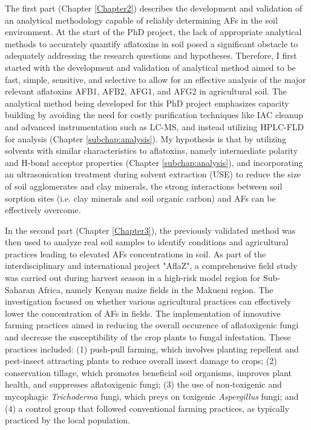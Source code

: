 The first part (Chapter \ref{Chapter2}) describes the development and validation of an analytical methodology capable of reliably determining AFs in the soil environment. At the start of the PhD project, the lack of appropriate analytical methods to accurately quantify aflatoxins in soil posed a significant obstacle to adequately addressing the research questions and hypotheses. Therefore, I first started with the development and validation of analytical method aimed to be fast, simple, sensitive, and selective to allow for an effective analysis of the major relevant aflatoxins AFB1, AFB2, AFG1, and AFG2 in agricultural soil. The analytical method being developed for this PhD project emphasizes capacity building by avoiding the need for costly purification techniques like IAC cleanup and advanced instrumentation such as LC-MS, and instead utilizing HPLC-FLD for analysis (Chapter \ref{subchap:analysis}). My hypothesis is that by utilizing solvents with similar characteristics to aflatoxins, namely intermediate polarity and H-bond acceptor properties (Chapter \ref{subchap:analysis}), and incorporating an ultrasonication treatment during solvent extraction (USE) to reduce the size of soil agglomerates and clay minerals, the strong interactions between soil sorption sites (i.e. clay minerals and soil organic carbon) and AFs can be effectively overcome.


In the second part (Chapter \ref{Chapter3}), the previously validated method was then used to analyze real soil samples to identify conditions and agricultural practices leading to elevated AFs concentrations in soil. As part of the interdisciplinary and international project "AflaZ", a comprehensive field study was carried out during harvest season in a high-risk model region for Sub-Saharan Africa, namely Kenyan maize fields in the Makueni region. The investigation focused on whether various agricultural practices can effectively lower the concentration of AFs in fields. The implementation of innovative farming practices aimed in reducing the overall occurence of aflatoxigenic fungi and decrease the susceptibility of the crop plants to fungal infestation. These practices included: (1) push-pull farming, which involves planting repellent and pest-insect attracting plants to reduce overall insect damage to crops; (2) conservation tillage, which promotes beneficial soil organisms, improves plant health, and suppresses aflatoxigenic fungi; (3) the use of non-toxigenic and mycophagic \textit{Trichoderma} fungi, which preys on toxigenic \textit{Aspergillus} fungi; and (4) a control group that followed conventional farming practices, as typically practiced by the local population.


